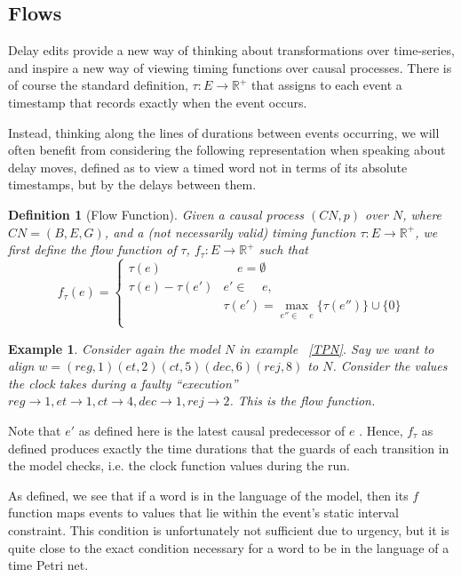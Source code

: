 \documentclass[conference]{IEEEtran}
\newcounter{cases}
\DeclareMathOperator*{\pre}{^\bullet}
\newtheorem{definition}{Definition}
\newtheorem{example}{Example}
\begin{document}
		\subsection{Flows}
		
		Delay edits provide a new way of thinking about transformations over time-series, and inspire a new way of viewing timing functions over causal processes. 
		There is of course the standard definition, $\tau : E \to \mathbb{R}^+$ that assigns to each event a timestamp that records exactly when the event occurs. 
		
		Instead, thinking along the lines of durations between events occurring, we will often benefit from considering the following representation when speaking about delay moves, defined as to view a timed word not in terms of its absolute timestamps, but by the delays between them. 
		
		\begin{definition}[Flow Function]
			Given a causal process $(CN, p)$ over $N$, where $CN = (B, E, G)$, and a (not necessarily valid) timing function $\tau : E \to \mathbb{R}^+$, we first define the \textit{flow} function of $\tau$, $f_{\tau} : E \to \mathbb{R}^+$ such that 
			$$f_{\tau}(e) = \begin{cases} 
				\tau(e) & \pre \pre e = \emptyset\\
				\tau(e) - \tau(e') &e' \in   \pre \pre e,\\ & \tau(e') = \max\limits_{e'' \in \pre \pre e} {\{\tau(e'')\} \cup \{0\}}\\
			\end{cases}
			$$
			
		\end{definition}
		
		\begin{example}\label{wordandflow}
			Consider again the model $N$ in example ~\ref{TPN}.
			Say we want to align  $w = (reg, 1)(et, 2)(ct, 5)(dec, 6)(rej, 8)$ to $N$.  
			Consider the values the clock takes during a faulty ``execution'' $reg \to 1, et \to 1, ct \to 4, dec \to 1, rej \to 2$. This is the flow function. 
		\end{example}
		
		Note that $e'$ as defined here is the latest causal predecessor of $e$
		. 
		Hence, $f_\tau$ as defined produces exactly the time durations that the guards of each transition in the model checks, i.e. the clock function values during the run. 
		
		As defined, we see that if a word is in the language of the model, then its $f$ function maps events to values that lie within the event's static interval constraint. %
		This condition is unfortunately not sufficient due to urgency, but it is quite close to the exact condition necessary for a word to be in the language of a time Petri net. 
		
\end{document}

